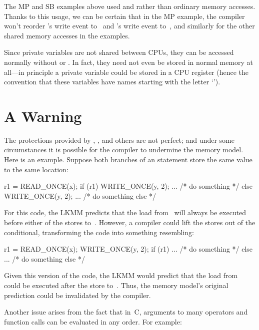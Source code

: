 The MP and SB examples above used  and 
rather than ordinary memory accesses.
Thanks to this usage, we can be certain that in the MP example, the
compiler won't reorder 's write event to~ and 's write
event to~, and similarly for the other shared memory accesses
in the examples.

Since private variables are not shared between CPUs, they can be
accessed normally without  or .
In fact, they need not even be stored in normal memory at
all---in principle a private variable could be stored in a CPU
register (hence the convention that these variables have names
starting with the letter `').


\section{A Warning}
\label{sec:docs:explanation:A Warning}

The protections provided by , , and
others are not perfect; and under some circumstances it is possible
for the compiler to undermine the memory model.
Here is an example.
Suppose both branches of an  statement store the same value
to the same location:

\begin{VerbatimU}
	r1 = READ_ONCE(x);
	if (r1) {
		WRITE_ONCE(y, 2);
		...  /* do something */
	} else {
		WRITE_ONCE(y, 2);
		...  /* do something else */
	}
\end{VerbatimU}

For this code, the LKMM predicts that the load from~ will always be
executed before either of the stores to~.
However, a compiler could lift the stores out of the conditional,
transforming the code into something resembling:

\begin{VerbatimU}
	r1 = READ_ONCE(x);
	WRITE_ONCE(y, 2);
	if (r1) {
		...  /* do something */
	} else {
		...  /* do something else */
	}
\end{VerbatimU}

Given this version of the code, the LKMM would predict that the load
from~ could be executed after the store to~.
Thus, the memory model's original prediction could be invalidated
by the compiler.

Another issue arises from the fact that in~C, arguments to many
operators and function calls can be evaluated in any order.
For example:

